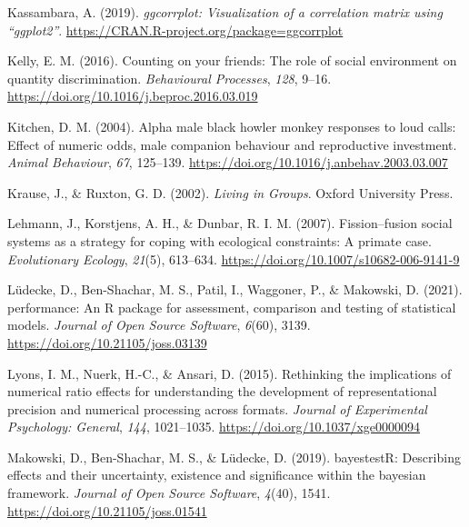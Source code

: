 \documentclass[
  ,pub,floatsintext]{apa6}
\newlength{\cslhangindent}
\newlength{\cslentryspacingunit} %
\newenvironment{CSLReferences}[2] %
 {%
  \setlength{\parindent}{0pt}
  \ifodd #1
  \let\oldpar\par
  \def\par{\hangindent=\cslhangindent\oldpar}
  \fi
  \setlength{\parskip}{#2\cslentryspacingunit}
 }%
 {}
\begin{document}
\begin{CSLReferences}{1}{0}
\leavevmode{}%
Kassambara, A. (2019). \emph{{ggcorrplot}: Visualization of a correlation matrix using {``ggplot2''}}. \url{https://CRAN.R-project.org/package=ggcorrplot}

\leavevmode{}%
Kelly, E. M. (2016). Counting on your friends: {The} role of social environment on quantity discrimination. \emph{Behavioural Processes}, \emph{128}, 9--16. \url{https://doi.org/10.1016/j.beproc.2016.03.019}

\leavevmode{}%
Kitchen, D. M. (2004). Alpha male black howler monkey responses to loud calls: Effect of numeric odds, male companion behaviour and reproductive investment. \emph{Animal Behaviour}, \emph{67}, 125--139. \url{https://doi.org/10.1016/j.anbehav.2003.03.007}

\leavevmode{}%
Krause, J., \& Ruxton, G. D. (2002). \emph{Living in {Groups}}. Oxford University Press.

\leavevmode{}%
Lehmann, J., Korstjens, A. H., \& Dunbar, R. I. M. (2007). Fission--fusion social systems as a strategy for coping with ecological constraints: A primate case. \emph{Evolutionary Ecology}, \emph{21}(5), 613--634. \url{https://doi.org/10.1007/s10682-006-9141-9}

\leavevmode{}%
Lüdecke, D., Ben-Shachar, M. S., Patil, I., Waggoner, P., \& Makowski, D. (2021). {performance}: An {R} package for assessment, comparison and testing of statistical models. \emph{Journal of Open Source Software}, \emph{6}(60), 3139. \url{https://doi.org/10.21105/joss.03139}

\leavevmode{}%
Lyons, I. M., Nuerk, H.-C., \& Ansari, D. (2015). Rethinking the implications of numerical ratio effects for understanding the development of representational precision and numerical processing across formats. \emph{Journal of Experimental Psychology: General}, \emph{144}, 1021--1035. \url{https://doi.org/10.1037/xge0000094}

\leavevmode{}%
Makowski, D., Ben-Shachar, M. S., \& Lüdecke, D. (2019). bayestestR: Describing effects and their uncertainty, existence and significance within the bayesian framework. \emph{Journal of Open Source Software}, \emph{4}(40), 1541. \url{https://doi.org/10.21105/joss.01541}


\end{CSLReferences}
\end{document}
